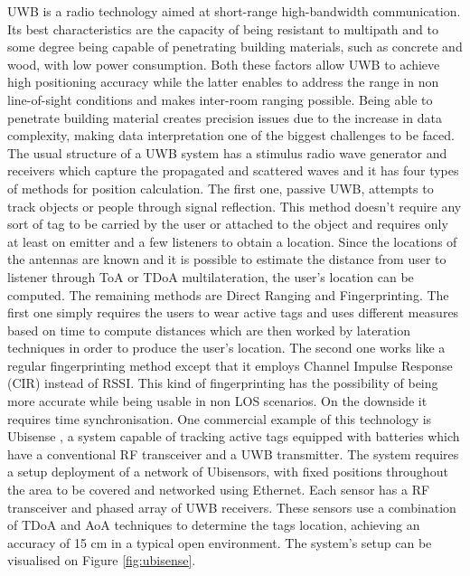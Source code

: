   
\ac{UWB} is a radio technology aimed at short-range high-bandwidth communication. Its best characteristics are the capacity of being resistant to multipath and to some degree being capable of penetrating building materials, such as concrete and wood, with low power consumption. Both these factors allow \ac{UWB} to achieve high positioning accuracy while the latter enables to address the range in non line-of-sight conditions and makes inter-room ranging possible. Being able to penetrate building material creates precision issues due to the increase in data complexity, making data interpretation one of the biggest challenges to be faced. The usual structure of a \ac{UWB} system has a stimulus radio wave generator and receivers which capture the propagated and scattered waves and it has four types of methods for position calculation.  
The first one, passive \ac{UWB}, attempts to track objects or people through signal reflection. This method doesn't require any sort of tag to be carried by the user or attached to the object and requires only at least on emitter and a few listeners to obtain a location. Since the locations of the antennas are known and it is possible to estimate the distance from user to listener through \ac{ToA} or \ac{TDoA} multilateration, the user's location can be computed.  
The remaining methods are Direct Ranging and Fingerprinting. The first one simply requires the users to wear active tags and uses different measures based on time to compute distances which are then worked by lateration techniques in order to produce the user's location. The second one works like a regular fingerprinting method except that it employs Channel Impulse Response (CIR) instead of \ac{RSSI}. This kind of fingerprinting has the possibility of being more accurate while being usable in non \ac{LOS} scenarios. On the downside it requires time synchronisation.  
One commercial example of this technology is Ubisense \cite{ubisense}, a system capable of tracking active tags equipped with batteries which have a conventional RF transceiver and a \ac{UWB} transmitter. The system requires a setup deployment of a network of Ubisensors, with fixed positions throughout the area to be covered and networked using Ethernet. Each sensor has a RF transceiver and  phased array of \ac{UWB} receivers. These sensors use a combination of \ac{TDoA} and \ac{AoA} techniques to determine the tags location, achieving an accuracy of 15 cm in a typical open environment. The system's setup can be visualised on Figure \ref{fig:ubisense}.  
  
  
  
